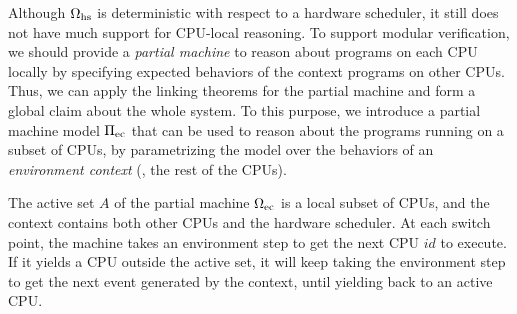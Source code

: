 Although $\Omega_{\text{hs}}$ is deterministic
with respect to a hardware scheduler,
it still does not have much support for CPU-local reasoning.
To support modular verification, 
we should provide a \emph{partial machine}
 to reason about programs on each CPU locally by specifying
expected behaviors of the context programs on other CPUs. Thus,
we can apply the linking theorems for the partial machine
 and 
 form a global
claim about the whole system. 
To this purpose, we introduce a partial
machine model $\Pi_{\text{ec}}$ that can be used to reason about the
programs running on a subset of CPUs, by
parametrizing the model over the behaviors of an \emph{environment context}
(\ie, the rest of the CPUs).

The active set $A$ of the partial machine  $\Omega_{\text{ec}}$
is a local subset of CPUs,
and the context contains
both other CPUs and the hardware scheduler.
At each switch point,
the machine takes an environment step
to get the next CPU $id$ to execute.
If it yields a CPU outside the active set,
it will keep taking the environment step
to get the next event generated
by the context, until yielding back to an active CPU.

